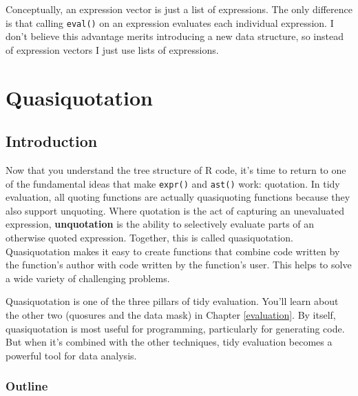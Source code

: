 \documentclass[]{book}
\begin{document}
Conceptually, an expression vector is just a list of expressions. The only difference is that calling \texttt{eval()} on an expression evaluates each individual expression. I don't believe this advantage merits introducing a new data structure, so instead of expression vectors I just use lists of expressions.

\hypertarget{quasiquotation}{%
\chapter{Quasiquotation}\label{quasiquotation}}

\hypertarget{introduction-3}{%
\section{Introduction}\label{introduction-3}}

Now that you understand the tree structure of R code, it's time to return to one of the fundamental ideas that make \texttt{expr()} and \texttt{ast()} work: quotation. In tidy evaluation, all quoting functions are actually quasiquoting functions because they also support unquoting. Where quotation is the act of capturing an unevaluated expression, \textbf{unquotation} is the ability to selectively evaluate parts of an otherwise quoted expression. Together, this is called quasiquotation. Quasiquotation makes it easy to create functions that combine code written by the function's author with code written by the function's user. This helps to solve a wide variety of challenging problems.

Quasiquotation is one of the three pillars of tidy evaluation. You'll learn about the other two (quosures and the data mask) in Chapter \ref{evaluation}. By itself, quasiquotation is most useful for programming, particularly for generating code. But when it's combined with the other techniques, tidy evaluation becomes a powerful tool for data analysis.

\hypertarget{outline-2}{%
\subsection*{Outline}\label{outline-2}}
\end{document}
